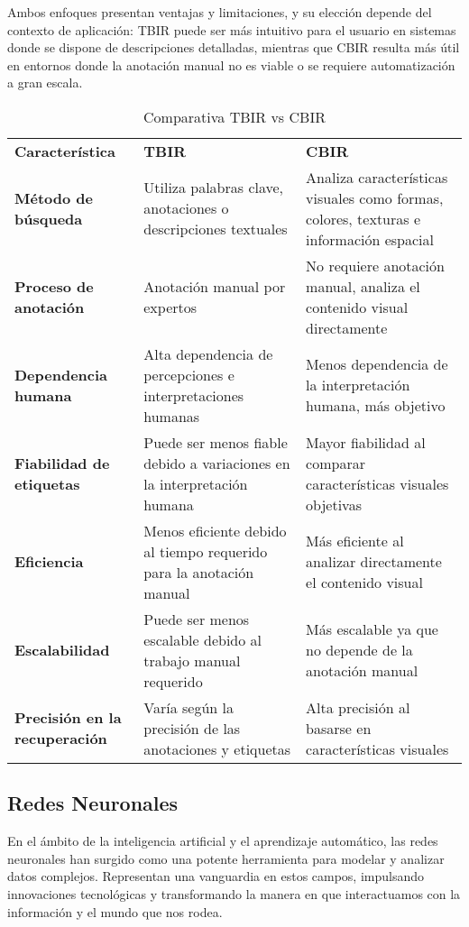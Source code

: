 Ambos enfoques presentan ventajas y limitaciones, y su elección depende del contexto de aplicación: TBIR puede ser más intuitivo para el usuario en sistemas donde se dispone de descripciones detalladas, mientras que CBIR resulta más útil en entornos donde la anotación manual no es viable o se requiere automatización a gran escala.

\begin{table}[H]
    \centering
    \renewcommand{\arraystretch}{1.5}
    \begin{tabular}{p{5cm}p{5cm}p{5cm}}
        \rowcolor{gray!30}
        \textbf{Característica} & \textbf{TBIR} & \textbf{CBIR} \\
        \rowcolor{gray!10}
        \textbf{Método de búsqueda} & Utiliza palabras clave, anotaciones o descripciones textuales & Analiza características visuales como formas, colores, texturas e información espacial \\
        \addlinespace
        \textbf{Proceso de anotación} & Anotación manual por expertos & No requiere anotación manual, analiza el contenido visual directamente \\
        \rowcolor{gray!10}
        \textbf{Dependencia humana} & Alta dependencia de percepciones e interpretaciones humanas & Menos dependencia de la interpretación humana, más objetivo \\
        \addlinespace
        \textbf{Fiabilidad de etiquetas} & Puede ser menos fiable debido a variaciones en la interpretación humana & Mayor fiabilidad al comparar características visuales objetivas \\
        \rowcolor{gray!10}
        \textbf{Eficiencia} & Menos eficiente debido al tiempo requerido para la anotación manual & Más eficiente al analizar directamente el contenido visual \\
        \addlinespace
        \textbf{Escalabilidad} & Puede ser menos escalable debido al trabajo manual requerido & Más escalable ya que no depende de la anotación manual \\
        \rowcolor{gray!10}
        \textbf{Precisión en la recuperación} & Varía según la precisión de las anotaciones y etiquetas & Alta precisión al basarse en características visuales \\
    \end{tabular}
    \caption{Comparativa TBIR vs CBIR}
    \label{tab:tbir-cbir}
\end{table}


\subsection{Redes Neuronales}
En el ámbito de la inteligencia artificial y el aprendizaje automático, las redes neuronales han surgido como una potente herramienta para modelar y analizar datos complejos. Representan una vanguardia en estos campos, impulsando innovaciones tecnológicas y transformando la manera en que interactuamos con la información y el mundo que nos rodea.

